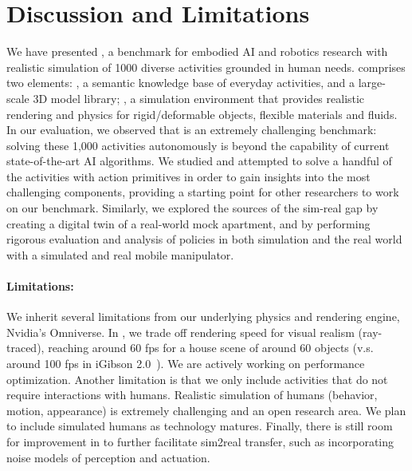 \section{Discussion and Limitations}
\label{sec:discuss}
We have presented \benchmark, a benchmark for embodied AI and robotics research with realistic simulation of 1000 diverse activities grounded in human needs. \benchmark comprises two elements: \dataset, a semantic knowledge base of everyday activities, and a large-scale 3D model library; \simulator, a simulation environment that provides realistic rendering and physics for rigid/deformable objects, flexible materials and fluids. In our evaluation, we observed that \benchmark is an extremely challenging benchmark: solving these 1,000 activities autonomously is beyond the capability of current state-of-the-art AI algorithms. We studied and attempted to solve a handful of the activities with action primitives in order to gain insights into the most challenging components, providing a starting point for other researchers to work on our benchmark. Similarly, we explored the sources of the sim-real gap by creating a digital twin of a real-world mock apartment, and by performing rigorous evaluation and analysis of policies in both simulation and the real world with a simulated and real mobile manipulator. 


\paragraph{Limitations:} We inherit several limitations from our underlying physics and rendering engine, Nvidia's Omniverse. In \simulator, we trade off rendering speed for visual realism (ray-traced), reaching around 60 fps for a house scene of around 60 objects (v.s. around 100 fps in iGibson 2.0~\cite{li2021ig2}). We are actively working on performance optimization. %
Another limitation is that we only include activities that do not require interactions with humans. Realistic simulation of humans (behavior, motion, appearance) is extremely challenging and an open research area. We plan to include simulated humans as technology matures. Finally, there is still room for improvement in \simulator to further facilitate sim2real transfer, such as incorporating noise models of perception and actuation.

